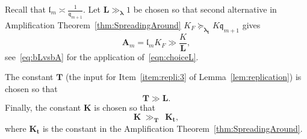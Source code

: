 \documentclass{amsart}
\newcommand{\1}{{\mathbb 1 }}
\newcommand{\blambda}{{\boldsymbol\lambda}}
\newcommand{\bA}{{\mathbf{A}}}
\newcommand{\bL}{{\mathbf L}}
\newcommand{\bT}{{\mathbf T}}
\newcommand{\bK}{{\mathbf K}}
\newcommand{\bbt}{{\mathbf t}}
\newcommand{\qq}{\mathfrak{q}}
\newcommand{\length}{{\mathfrak l}}
\theoremstyle{remark}
\numberwithin{equation}{section}
\theoremstyle{definition}
\begin{document}
Recall that $\length_m \asymp \frac{1}{\qq_{m+1}}$.  Let $\bL \gg_\blambda 1$ be chosen so that second alternative in Amplification Theorem~\ref{thm:SpreadingAround} $K_F\succeq_{\blambda_\bbt} K \qq_{m+1}$ gives
\begin{equation}\label{eqn:choiceL}
    \bA_m = \length_m K_F \gg \frac{K}{\bL},
\end{equation}
see~\eqref{eq:bLvsbA} for the application of~\eqref{eqn:choiceL}.

The constant $\bT$ (the input for Item~\ref{item:repli:3} of Lemma~\ref{lem:replication}) is chosen so that 
\begin{equation}
\label{eq:dfn:bT} \bT \gg \bL.    
\end{equation}
Finally, the constant $\bK$ is chosen so that 
\begin{equation}
\label{eq:dfn:bT}\bK\ \gg_{\bT}\ \  \bK_\bbt,
\end{equation}
 where $\bK_\bbt$ is the constant in the Amplification Theorem~\ref{thm:SpreadingAround}.
\end{document}
